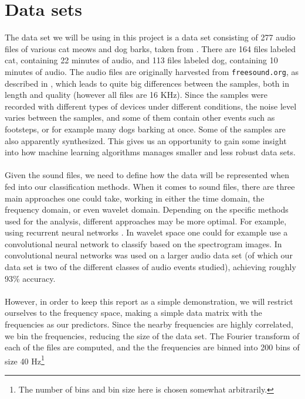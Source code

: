 \documentclass[a4paper]{article}
\begin{document}
\section{Data sets} \label{chap:data_sets}
The data set we will be using in this project is a data set consisting of 277 audio files of various cat meows and dog barks, taken from \cite{Kaggle_catdog}. There are 164 files labeled cat, containing 22 minutes of audio, and 113 files labeled dog, containing 10 minutes of audio. The audio files are originally harvested from \texttt{freesound.org}, as described in \cite{Takahashi+2016}, which leads to quite big differences between the samples, both in length and quality (however all files are 16 KHz). Since the samples were recorded with different types of devices under different conditions, the noise level varies between the samples, and some of them contain other events such as footsteps, or for example many dogs barking at once. Some of the samples are also apparently synthesized. This gives us an opportunity to gain some insight into how machine learning algorithms manages smaller and less robust data sets.
\\\\
Given the sound files, we need to define how the data will be represented when fed into our classification methods. When it comes to sound files, there are three main approaches one could take, working in either the time domain, the frequency domain, or even wavelet domain. Depending on the specific methods used for the analysis, different approaches may be more optimal. For example, using recurrent neural networks \cite{phan2017audio}.
In wavelet space one could for example use a convolutional neural network to classify based on the spectrogram images. In \cite{Takahashi+2016} convolutional neural networks was used on a larger audio data set (of which our data set is two of the different classes of audio events studied), achieving roughly 93\% accuracy.
\\\\
However, in order to keep this report as a simple demonstration, we will restrict ourselves to the frequency space, making a simple data matrix with the frequencies as our predictors. Since the nearby frequencies are highly correlated, we bin the frequencies, reducing the size of the data set. The Fourier transform of each of the files are computed, and the the frequencies are binned into 200 bins of size 40 Hz\footnote{The number of bins and bin size here is chosen somewhat arbitrarily.}
\end{document}
